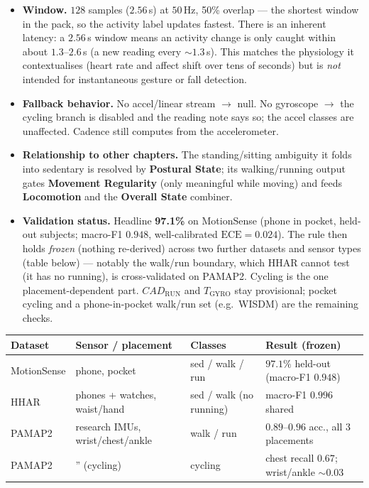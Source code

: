 \begin{itemize}[leftmargin=1.4em]
  \item \textbf{Window.} $128$ samples ($2.56$\,s) at $50$\,Hz, 50\% overlap --- the shortest
  window in the pack, so the activity label updates fastest. There is an inherent latency: a
  $2.56$\,s window means an activity change is only caught within about $1.3$--$2.6$\,s (a new
  reading every ${\sim}1.3$\,s). This matches the physiology it contextualises (heart rate and
  affect shift over tens of seconds) but is \emph{not} intended for instantaneous gesture or
  fall detection.
  \item \textbf{Fallback behavior.} No accel/linear stream $\rightarrow$ null. No gyroscope
  $\rightarrow$ the cycling branch is disabled and the reading note says so; the accel classes
  are unaffected. Cadence still computes from the accelerometer.
  \item \textbf{Relationship to other chapters.} The standing/sitting ambiguity it folds into
  sedentary is resolved by \textbf{Postural State}; its walking/running output gates
  \textbf{Movement Regularity} (only meaningful while moving) and feeds \textbf{Locomotion}
  and the \textbf{Overall State} combiner.
  \item \textbf{Validation status.} Headline \textbf{97.1\%} on MotionSense (phone in pocket,
  held-out subjects; macro-F1 $0.948$, well-calibrated $\mathrm{ECE}=0.024$). The rule then
  holds \emph{frozen} (nothing re-derived) across two further datasets and sensor types
  (table below) --- notably the walk/run boundary, which HHAR cannot test (it has no running),
  is cross-validated on PAMAP2. Cycling is the one placement-dependent part.
  $CAD_\text{RUN}$ and $T_\text{GYRO}$ stay provisional; pocket cycling and a phone-in-pocket
  walk/run set (e.g.\ WISDM) are the remaining checks.
\end{itemize}

\begin{center}
\begin{tabular}{@{}>{\raggedright\arraybackslash}p{2.3cm} >{\raggedright\arraybackslash}p{3.5cm} >{\raggedright\arraybackslash}p{2.5cm} >{\raggedright\arraybackslash}p{4.1cm}@{}}
\toprule
\textbf{Dataset} & \textbf{Sensor / placement} & \textbf{Classes} & \textbf{Result (frozen)} \\
\midrule
MotionSense & phone, pocket & sed / walk / run & $97.1\%$ held-out (macro-F1 $0.948$) \\
HHAR & phones + watches, waist/hand & sed / walk (no running) & macro-F1 $0.996$ shared \\
PAMAP2 & research IMUs, wrist/chest/ankle & walk / run & $0.89$--$0.96$ acc., all 3 placements \\
PAMAP2 & \quad'' \;(cycling) & cycling & chest recall $0.67$; wrist/ankle ${\sim}0.03$ \\
\bottomrule
\end{tabular}
\end{center}

